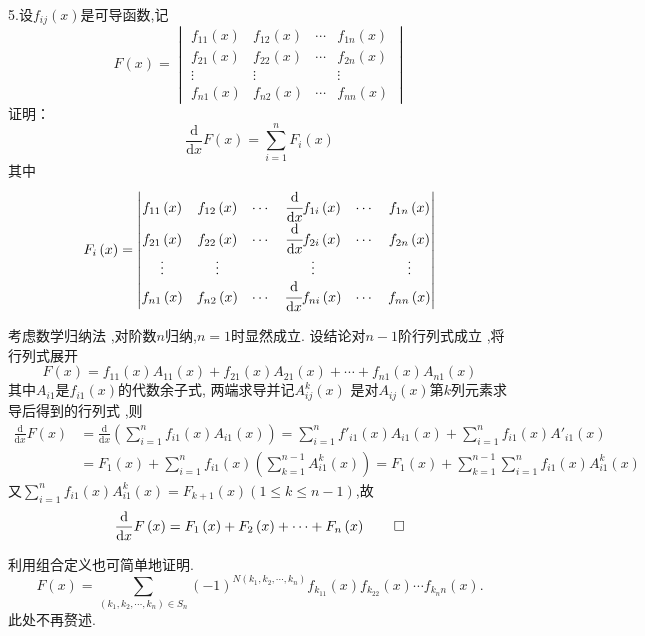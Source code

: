5.设$f_{ij}\left(x\right)$是可导函数,记
\[
F\left(x\right)=
\begin{vmatrix}
    f_{11}\left(x\right)&f_{12}\left(x\right)&\cdots&f_{1n}\left(x\right)\\
    f_{21}\left(x\right)&f_{22}\left(x\right)&\cdots&f_{2n}\left(x\right)\\
    \vdots&\vdots&&\vdots\\
    f_{n1}\left(x\right)&f_{n2}\left(x\right)&\cdots&f_{nn}\left(x\right)
\end{vmatrix}
\]
证明：
\[
\frac{\mathrm{d}}{\mathrm{d}x}F\left(x\right)
=
\sum_{i=1}^{n}F_i\left(x\right)
\]
其中
\[
F_i\left(x\right)
=
\begin{vmatrix}
    f_{11}\left(x\right)&f_{12}\left(x\right)&\cdots&\cfrac{\mathrm{d}}{\mathrm{d}x}f_{1i}\left(x\right)&\cdots&f_{1n}\left(x\right)\\
    f_{21}\left(x\right)&f_{22}\left(x\right)&\cdots&\cfrac{\mathrm{d}}{\mathrm{d}x}f_{2i}\left(x\right)&\cdots&f_{2n}\left(x\right)\\
    \vdots&\vdots&&\vdots&&\vdots\\
    f_{n1}\left(x\right)&f_{n2}\left(x\right)&\cdots&\cfrac{\mathrm{d}}{\mathrm{d}x}f_{ni}\left(x\right)&\cdots&f_{nn}\left(x\right)
\end{vmatrix}
\]
\begin{Proof}
考虑数学归纳法
,对阶数$n$归纳,$n=1$时显然成立.
设结论对$n-1$阶行列式成立
,将行列式展开
\[
F\left(x\right)
=
f_{11}\left(x\right)
A_{11}\left(x\right)
+f_{21}\left(x\right)A_{21}\left(x\right)+
\cdots+f_{n1}\left(x\right)A_{n1}\left(x\right)
\]
其中$A_{i1}$是$f_{i1}\left(x\right)$的代数余子式,
两端求导并记$A_{ij}^k\left(x\right)$
是对$A_{ij}\left(x\right)$第$k$列元素求导后得到的行列式
,则
\begin{align*}
    \frac{\mathrm{d}}{\mathrm{d}x}F\left(x\right)
    &=\frac{\mathrm{d}}{\mathrm{d}x}\left(
        \sum_{i=1}^{n}f_{i1}\left(x\right)A_{i1}\left(x\right)
    \right)
    =\sum_{i=1}^{n}f'_{i1}\left(x\right)A_{i1}\left(x\right)
    +\sum_{i=1}^{n}f_{i1}\left(x\right)A'_{i1}\left(x\right)\\
    &=F_1\left(x\right)+\sum_{i=1}^{n}f_{i1}\left(x\right)
    \left(\sum_{k=1}^{n-1}A^k_{i1}\left(x
    \right)\right)=F_1\left(x\right)+
    \sum_{k=1}^{n-1}\sum_{i=1}^{n}
    f_{i1}\left(x\right)A^k_{i1}\left(x\right)
\end{align*}
又$\displaystyle
\sum_{i=1}^{n}f_{i1}\left(x\right)A_{i1}^k\left(x
\right)=F_{k+1}\left(x\right)\left(
    1\leqslant k\leqslant n-1
\right)$,故
\[
\frac{\mathrm{d}}{\mathrm{d}x}F\left(x\right)
=
F_{1}\left(x\right)+F_2\left(x
\right)+\cdots+F_n\left(x\right)
\qedhere
\]
\end{Proof}
利用组合定义也可简单地证明.
\[
F\left(x\right)=
\sum_{\left(k_1,k_2,\cdots,k_n\right)\in
S_n}\left(-1\right)^{N\left(k_1,k_2,\cdots,k_n\right)}
f_{k_11}\left(x\right)f_{k_22}\left(x\right)\cdots
f_{k_nn}\left(x\right).
\]
此处不再赘述.

